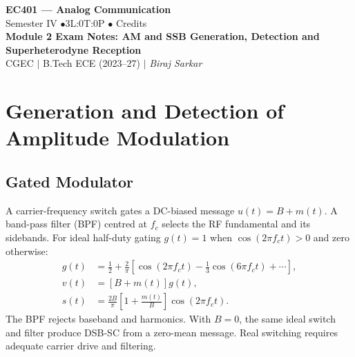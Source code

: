 \documentclass[12pt,a4paper]{article}
\begin{document}
\begin{center}
  {\LARGE\bfseries\color{myred} EC401 --- Analog Communication}\\[5pt]
  {\normalsize\color{mydark} Semester IV \quad$\bullet$\quad 3L:0T:0P \quad$\bullet$ Credits}\\[3pt]
  {\normalsize\color{myteal}\textbf{Module 2 Exam Notes: AM and SSB Generation, Detection and Superheterodyne Reception}}\\[3pt]
  {\small\color{mydark} CGEC \;$|$\; B.Tech ECE (2023--27) \;$|$\; \textit{Biraj Sarkar}}
\end{center}
\vspace{2pt}
\noindent{\color{myred}\rule{\linewidth}{1.5pt}}
\vspace{2pt}

\hypersetup{linkcolor=mydark}
\tableofcontents
\hypersetup{linkcolor=myteal}
\newpage

\section{Generation and Detection of Amplitude Modulation}
\subsection{Gated Modulator}
\begin{tcolorbox}[defbox, title={Carrier-Controlled Switching}]
A carrier-frequency switch gates a DC-biased message $u(t)=B+m(t)$. A band-pass filter (BPF) centred at $f_c$ selects the RF fundamental and its sidebands. For ideal half-duty gating $g(t)=1$ when $\cos(2\pi f_ct)>0$ and zero otherwise:
\[
\begin{aligned}
 g(t)&=\frac12+\frac{2}{\pi}\left[
 \cos(2\pi f_ct)-\frac13\cos(6\pi f_ct)+\cdots\right],\\
 v(t)&=[B+m(t)]g(t),\\
 s(t)&=\frac{2B}{\pi}\left[1+\frac{m(t)}{B}\right]\cos(2\pi f_ct).
\end{aligned}
\]
The BPF rejects baseband and harmonics. With $B=0$, the same ideal switch and filter produce DSB-SC from a zero-mean message. Real switching requires adequate carrier drive and filtering.
\end{tcolorbox}
\end{document}
